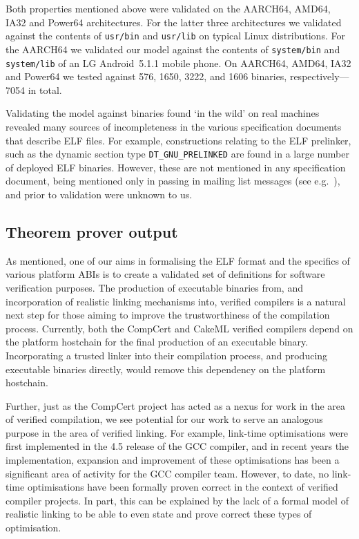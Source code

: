 Both properties mentioned above were validated on the AARCH64, AMD64, IA32 and Power64 architectures.
For the latter three architectures we validated against the contents of \texttt{usr/bin} and \texttt{usr/lib} on typical Linux distributions.
For the AARCH64 we validated our model against the contents of \texttt{system/bin} and \texttt{system/lib} of an LG Android~5.1.1 mobile phone.
On AARCH64, AMD64, IA32 and Power64 we tested against 576, 1650, 3222, and 1606 binaries, respectively---7054 in total.

Validating the model against binaries found `in the wild' on real machines revealed many sources of incompleteness in the various specification documents that describe ELF files.
For example, constructions relating to the ELF prelinker, such as the dynamic section type \texttt{DT\_GNU\_PRELINKED} are found in a large number of deployed ELF binaries.
However, these are not mentioned in any specification document, being mentioned only in passing in mailing list messages (see e.g.~\cite{jelinek-prelinker-2001}), and prior to validation were unknown to us.

\subsection{Theorem prover output}
\label{subsect.theorem.prover.output}

As mentioned, one of our aims in formalising the ELF format and the specifics of various platform ABIs is to create a validated set of definitions for software verification purposes.
The production of executable binaries from, and incorporation of realistic linking mechanisms into, verified compilers is a natural next step for those aiming to improve the trustworthiness of the compilation process.
Currently, both the CompCert and CakeML verified compilers depend on the platform hostchain for the final production of an executable binary.
Incorporating a trusted linker into their compilation process, and producing executable binaries directly, would remove this dependency on the platform hostchain.

Further, just as the CompCert project has acted as a nexus for work in the area of verified compilation, we see potential for our work to serve an analogous purpose in the area of verified linking.
For example, link-time optimisations were first implemented in the 4.5 release of the GCC compiler, and in recent years the implementation, expansion and improvement of these optimisations has been a significant area of activity for the GCC compiler team.
However, to date, no link-time optimisations have been formally proven correct in the context of verified compiler projects.
In part, this can be explained by the lack of a formal model of realistic linking to be able to even state and prove correct these types of optimisation.

